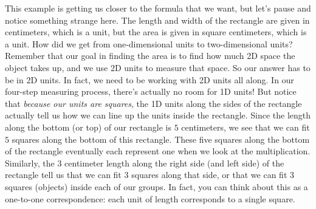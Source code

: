 \documentclass{ximera}
\begin{document}
This example is getting us closer to the formula that we want, but let's pause and notice something strange here. The length and width of the rectangle are given in centimeters, which is a  unit, but the area is given in square centimeters, which is a  unit. How did we get from one-dimensional units to two-dimensional units? Remember that our goal in finding the area is to find how much 2D space the object takes up, and we use 2D units to measure that space. So our answer has to be in 2D units. In fact, we need to be working with 2D units all along. In our four-step measuring process, there's actually no room for 1D units! But notice that \emph{because our units are squares}, the 1D units along the sides of the rectangle actually tell us how we can line up the units inside the rectangle. Since the length along the bottom (or top) of our rectangle is $5$ centimeters, we see that we can fit $5$ squares along the bottom of this rectangle. These five squares along the bottom of the rectangle eventually each represent one  when we look at the multiplication. Similarly, the $3$ centimeter length along the right side (and left side) of the rectangle tell us that we can fit $3$ squares along that side, or that we can fit $3$ squares (objects) inside each of our groups. In fact, you can think about this as a one-to-one correspondence: each unit of length corresponds to a single square.
\end{document}
